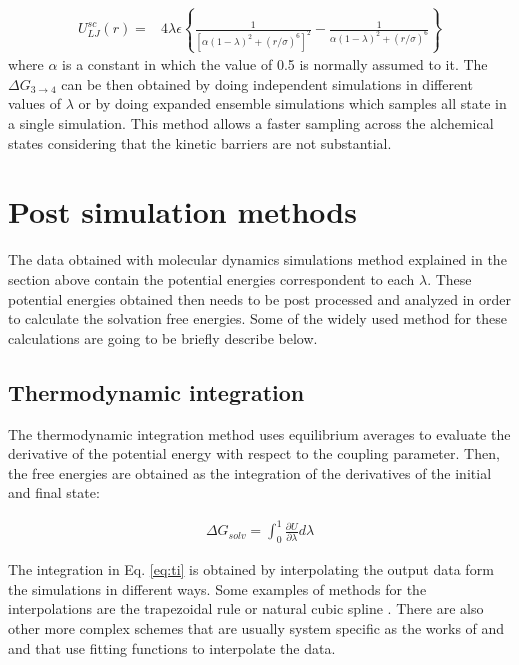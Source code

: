 \begin{equation}
\label{eq:softcore}
\begin{aligned}
U_{LJ}^{sc}(r) {}=& 4\lambda\epsilon \left\lbrace\frac{1}{\left[\alpha(1-\lambda)^{2}+ (r/\sigma)^{6}\right]^{2}} - \frac{1}{\alpha(1-\lambda)^2+(r/\sigma)^{6}}\right\rbrace
\end{aligned}
\end{equation}
where $\alpha$ is a constant in which the value of 0.5 is normally assumed to it. The $\Delta G_{3 \rightarrow 4}$ can be then obtained by doing independent simulations in different values of $\lambda$ or by doing expanded ensemble simulations \cite{lyubartsev} which samples all state in a single simulation. This method allows a faster sampling across the alchemical states considering that the kinetic barriers are not substantial. 

\section{Post simulation methods}

The data obtained with molecular dynamics simulations method explained in the section above contain the potential energies correspondent to each $\lambda$. These potential energies obtained then needs to be post processed and analyzed in order to calculate the solvation free energies. Some of the widely used method for these calculations are going to be briefly describe below. 

\subsection{Thermodynamic integration}

The thermodynamic integration method \cite{kirkwood1935} uses equilibrium averages to evaluate the derivative of the potential energy with respect to the coupling parameter. Then, the free energies are obtained as the integration of the derivatives of the initial and final state:

\begin{equation}
\label{eq:ti}
\begin{aligned}
\Delta G_{solv} = \int_{0}^{1} \frac{\partial U}{\partial \lambda} d\lambda
\end{aligned}
\end{equation}

The integration in Eq. \eqref{eq:ti} is obtained by interpolating the output data form the simulations in different ways. Some examples of methods for the interpolations are the trapezoidal rule or natural cubic spline \cite{bareva}. There are also other more complex schemes that are usually system specific as the works of  and  and that use fitting functions to interpolate the data. 

